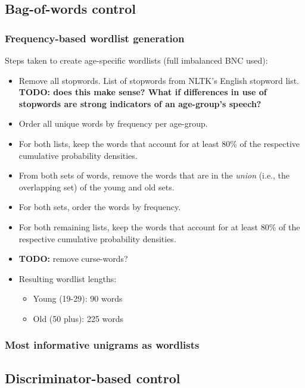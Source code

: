 \subsection{Bag-of-words control}

\subsubsection{Frequency-based wordlist generation}

Steps taken to create age-specific wordlists (full imbalanced BNC used):
\begin{itemize}
    \item Remove all stopwords. List of stopwords from NLTK's English stopword list. \textbf{TODO: does this make sense? What if differences in use of stopwords are strong indicators of an age-group's speech?}
    \item Order all unique words by frequency per age-group.
    \item For both lists, keep the words that account for at least 80\% of the respective cumulative probability densities.
    \item From both sets of words, remove the words that are in the \textit{union} (i.e., the overlapping set) of the young and old sets.
    \item For both sets, order the words by frequency.
    \item For both remaining lists, keep the words that account for at least 80\% of the respective cumulative probability densities.
    \item \textbf{TODO:} remove curse-words?
    \item Resulting wordlist lengths:
        \begin{itemize}
            \item Young (19-29): 90 words
            \item Old (50 plus): 225 words
        \end{itemize}
\end{itemize}

\subsubsection{Most informative unigrams as wordlists}

\subsection{Discriminator-based control}




